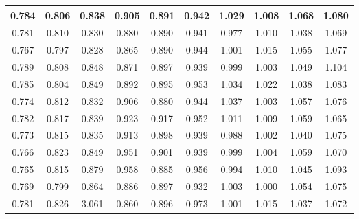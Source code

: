 \begin{table}[!ht]
\begin{tabular}{|c|c|c|c|c|c|c|c|c|c|}
      0.784 & 0.806 & 0.838 & 0.905 & 0.891 & 0.942 & 1.029 & 1.008 & 1.068 & 1.080 \\ \hline
      0.781 & 0.810 & 0.830 & 0.880 & 0.890 & 0.941 & 0.977 & 1.010 & 1.038 & 1.069 \\ \hline
      0.767 & 0.797 & 0.828 & 0.865 & 0.890 & 0.944 & 1.001 & 1.015 & 1.055 & 1.077 \\ \hline
      0.789 & 0.808 & 0.848 & 0.871 & 0.897 & 0.939 & 0.999 & 1.003 & 1.049 & 1.104 \\ \hline
      0.785 & 0.804 & 0.849 & 0.892 & 0.895 & 0.953 & 1.034 & 1.022 & 1.038 & 1.083 \\ \hline
      0.774 & 0.812 & 0.832 & 0.906 & 0.880 & 0.944 & 1.037 & 1.003 & 1.057 & 1.076 \\ \hline
      0.782 & 0.817 & 0.839 & 0.923 & 0.917 & 0.952 & 1.011 & 1.009 & 1.059 & 1.065 \\ \hline
      0.773 & 0.815 & 0.835 & 0.913 & 0.898 & 0.939 & 0.988 & 1.002 & 1.040 & 1.075 \\ \hline
      0.766 & 0.823 & 0.849 & 0.951 & 0.901 & 0.939 & 0.999 & 1.004 & 1.059 & 1.070 \\ \hline
      0.765 & 0.815 & 0.879 & 0.958 & 0.885 & 0.956 & 0.994 & 1.010 & 1.045 & 1.093 \\ \hline
      0.769 & 0.799 & 0.864 & 0.886 & 0.897 & 0.932 & 1.003 & 1.000 & 1.054 & 1.075 \\ \hline
      0.781 & 0.826 & 3.061 & 0.860 & 0.896 & 0.973 & 1.001 & 1.015 & 1.037 & 1.072 \\ \hline
  \end{tabular}
\end{table}